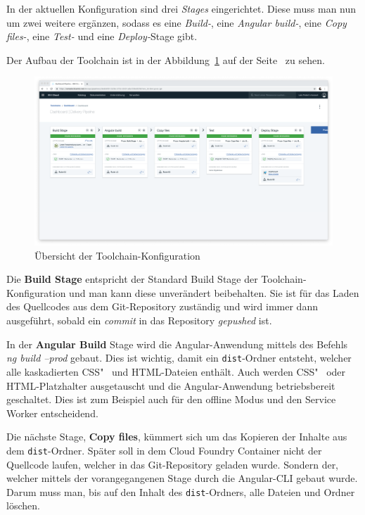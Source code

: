In der aktuellen Konfiguration sind drei \textit{Stages} eingerichtet. Diese muss man nun um zwei weitere ergänzen,
sodass es eine \textit{Build-}, eine \textit{Angular build-}, eine \textit{Copy files-}, eine \textit{Test-} und eine
\textit{Deploy-}Stage gibt.

Der Aufbau der Toolchain ist in der Abbildung~\ref{fig:umsetzung_toolchain_pipeline_frontend} auf der
Seite~\pageref{fig:umsetzung_toolchain_pipeline_frontend} zu sehen.

\begin{figure}[h]
    \centering
    \includegraphics[width=\textwidth]{images/kapitel_4/toolchain_pipeline.png}
    \caption{Übersicht der Toolchain-Konfiguration}
    \label{fig:umsetzung_toolchain_pipeline_frontend}
\end{figure}

Die \textbf{Build Stage} entspricht der Standard Build Stage der Toolchain-Konfiguration und man kann diese unverändert
beibehalten. Sie ist für das Laden des Quellcodes aus dem Git-Repository zuständig und wird immer dann ausgeführt,
sobald ein \textit{commit} in das Repository \textit{gepushed} ist.

In der \textbf{Angular Build} Stage wird die Angular-Anwendung mittels des Befehls \textit{ng build --prod} gebaut. Dies
ist wichtig, damit ein \texttt{dist}-Ordner entsteht, welcher alle kaskadierten CSS"~ und HTML-Dateien enthält. Auch
werden CSS"~ oder HTML-Platzhalter ausgetauscht und die Angular-Anwendung betriebsbereit geschaltet. Dies ist zum
Beispiel auch für den offline Modus und den Service Worker entscheidend.

Die nächste Stage, \textbf{Copy files}, kümmert sich um das Kopieren der Inhalte aus dem \texttt{dist}-Ordner. Später
soll in dem Cloud Foundry Container nicht der Quellcode laufen, welcher in das Git-Repository geladen wurde. Sondern
der, welcher mittels der vorangegangenen Stage durch die Angular-CLI gebaut wurde. Darum muss man, bis auf den Inhalt
des \texttt{dist}-Ordners, alle Dateien und Ordner löschen.

